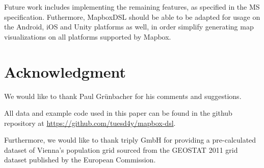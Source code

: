 \documentclass[conference]{IEEEtran}
\begin{document}
Future work includes implementing the remaining features, as specified in the MS specification. Futhermore, MapboxDSL should be able to be adapted for usage on the Android, iOS and Unity platforms as well, in order simplify generating map visualizations on all platforms supported by Mapbox.


\section*{Acknowledgment}

We would like to thank Paul Grünbacher for his comments and suggestions. 

All data and example code used in this paper can be found in the github repository at \href{https://github.com/tuesd4y/mapbox-dsl}{https://github.com/tuesd4y/mapbox-dsl}.

Furthermore, we would like to thank triply GmbH for providing a pre-calculated dataset of Vienna's population grid sourced from the GEOSTAT 2011 grid dataset published by the European Commission.



\end{document}

